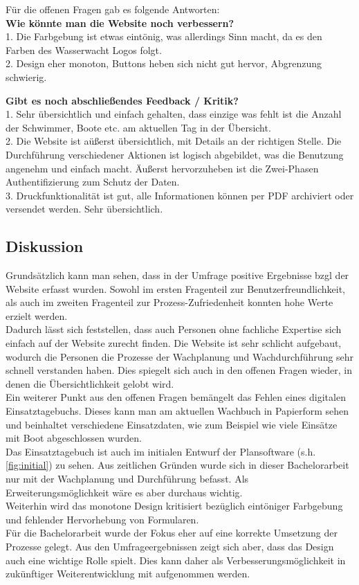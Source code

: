 \documentclass[fontsize=12pt,openright,oneside,paper=a4,BCOR=1cm]{scrbook}
\begin{document}
Für die offenen Fragen gab es folgende Antworten: \\
\textbf{Wie könnte man die Website noch verbessern?} \\
1. Die Farbgebung ist etwas eintönig, was allerdings Sinn macht, da es den Farben des Wasserwacht Logos folgt. \\
2. Design eher monoton, Buttons heben sich nicht gut hervor, Abgrenzung schwierig. 

\textbf{Gibt es noch abschließendes Feedback / Kritik?} \\
1. Sehr übersichtlich und einfach gehalten, dass einzige was fehlt ist die Anzahl der Schwimmer, Boote etc. am aktuellen Tag in der Übersicht. \\
2. Die Website ist aüßerst übersichtlich, mit Details an der richtigen Stelle. Die Durchführung verschiedener Aktionen ist logisch abgebildet, was die Benutzung angenehm und einfach macht. Äußerst hervorzuheben ist die Zwei-Phasen Authentifizierung zum Schutz der Daten. \\
3. Druckfunktionalität ist gut, alle Informationen können per PDF archiviert oder versendet werden. Sehr übersichtlich. 

\subsection{Diskussion}
Grundsätzlich kann man sehen, dass in der Umfrage positive Ergebnisse bzgl der Website erfasst wurden. Sowohl im ersten Fragenteil zur Benutzerfreundlichkeit, als auch im zweiten Fragenteil zur Prozess-Zufriedenheit konnten hohe Werte erzielt werden. \\  
Dadurch lässt sich feststellen, dass auch Personen ohne fachliche Expertise sich einfach auf der Website zurecht finden. Die Website ist sehr schlicht aufgebaut, wodurch die Personen die Prozesse der Wachplanung und Wachdurchführung sehr schnell verstanden haben. Dies spiegelt sich auch in den offenen Fragen wieder, in denen die Übersichtlichkeit gelobt wird. \\ 
Ein weiterer Punkt aus den offenen Fragen bemängelt das Fehlen eines digitalen Einsatztagebuchs. Dieses kann man am aktuellen Wachbuch in Papierform sehen und beinhaltet verschiedene Einsatzdaten, wie zum Beispiel wie viele Einsätze mit Boot abgeschlossen wurden. \\
Das Einsatztagebuch ist auch im initialen Entwurf der Plansoftware (s.h. \ref{fig:initial}) zu sehen. Aus zeitlichen Gründen wurde sich in dieser Bachelorarbeit nur mit der Wachplanung und Durchführung befasst. Als Erweiterungsmöglichkeit wäre es aber durchaus wichtig. \\
Weiterhin wird das monotone Design kritisiert bezüglich eintöniger Farbgebung und fehlender Hervorhebung von Formularen. \\
Für die Bachelorarbeit wurde der Fokus eher auf eine korrekte Umsetzung der Prozesse gelegt.  Aus den Umfrageergebnissen zeigt sich aber, dass das Design auch eine wichtige Rolle spielt. Dies kann daher als Verbesserungsmöglichkeit in zukünftiger Weiterentwicklung mit aufgenommen werden.
\end{document}
